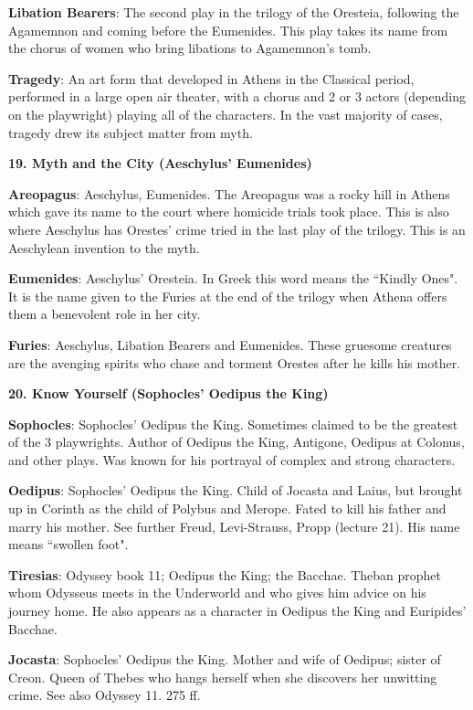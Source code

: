 \documentclass{scrartcl}
\begin{document}
\begin{multicols*}{3}
{\bf Libation Bearers}: The second play in the trilogy of the Oresteia, following the Agamemnon and coming before the Eumenides. This play takes its name from the chorus of women who bring libations to Agamemnon's tomb.

{\bf Tragedy}: An art form that developed in Athens in the Classical period, performed in a large open air theater, with a chorus and 2 or 3 actors (depending on the playwright) playing all of the characters. In the vast majority of cases, tragedy drew its subject matter from myth.


{\bf 19. Myth and the City (Aeschylus' Eumenides)}

{\bf Areopagus}: Aeschylus, Eumenides. The Areopagus was a rocky hill in Athens which gave its name to the court where homicide trials took place. This is also where Aeschylus has Orestes' crime tried in the last play of the trilogy. This is an Aeschylean invention to the myth.

{\bf Eumenides}: Aeschylus' Oresteia. In Greek this word means the ``Kindly Ones". It is the name given to the Furies at the end of the trilogy when Athena offers them a benevolent role in her city.

{\bf Furies}: Aeschylus, Libation Bearers and Eumenides. These gruesome creatures are the avenging spirits who chase and torment Orestes after he kills his mother.


{\bf 20. Know Yourself (Sophocles' Oedipus the King)}

{\bf Sophocles}: Sophocles' Oedipus the King. Sometimes claimed to be the greatest of the 3 playwrights. Author of Oedipus the King, Antigone, Oedipus at Colonus, and other plays. Was known for his portrayal of complex and strong characters.

{\bf Oedipus}: Sophocles' Oedipus the King. Child of Jocasta and Laius, but brought up in Corinth as the child of Polybus and Merope. Fated to kill his father and marry his mother. See further Freud, Levi-Strauss, Propp (lecture 21). His name means ``swollen foot".

{\bf Tiresias}: Odyssey book 11; Oedipus the King; the Bacchae. Theban prophet whom Odysseus meets in the Underworld and who gives him advice on his journey home. He also appears as a character in Oedipus the King and Euripides' Bacchae.

{\bf Jocasta}: Sophocles' Oedipus the King. Mother and wife of Oedipus; sister of Creon. Queen of Thebes who hangs herself when she discovers her unwitting crime. See also Odyssey 11. 275 ff.


\end{multicols*}
\end{document}
